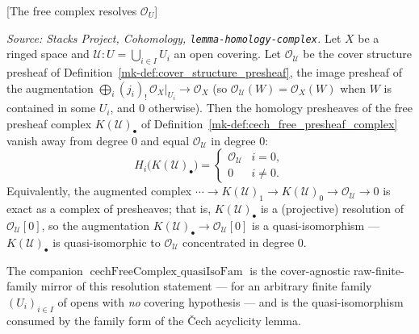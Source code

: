 \begin{lemma}

[The free complex resolves \(\mathcal{O}_U\)]
  \label{mk-lem:cech_free_complex_quasi_iso}

  \textit{Source: Stacks Project, Cohomology,
  \texttt{lemma-homology-complex}.}
  Let \(X\) be a ringed space and \(\mathcal{U} : U = \bigcup_{i \in I} U_i\) an
  open covering. Let \(\mathcal{O}_{\mathcal{U}}\) be the cover structure presheaf of
  Definition~\ref{mk-def:cover_structure_presheaf}, the image presheaf of the
  augmentation \(\bigoplus_i (j_i)_{!}\,\mathcal{O}_X|_{U_i} \to \mathcal{O}_X\) (so
  \(\mathcal{O}_{\mathcal{U}}(W) = \mathcal{O}_X(W)\) when \(W\) is contained in some
  \(U_i\), and \(0\) otherwise). Then the homology
  presheaves of the free presheaf complex
  \(K(\mathcal{U})_\bullet\) of Definition~\ref{mk-def:cech_free_presheaf_complex}
  vanish away from degree \(0\) and equal \(\mathcal{O}_{\mathcal{U}}\) in degree
  \(0\):
  \[
    H_i\bigl(K(\mathcal{U})_\bullet\bigr) =
    \begin{cases}
      \mathcal{O}_{\mathcal{U}} & i = 0, \\
      0 & i \neq 0.
    \end{cases}
  \]
  Equivalently, the augmented complex \(\cdots \to K(\mathcal{U})_1 \to
  K(\mathcal{U})_0 \to \mathcal{O}_{\mathcal{U}} \to 0\) is exact as a complex of
  presheaves; that is, \(K(\mathcal{U})_\bullet\) is a (projective) resolution of
  \(\mathcal{O}_{\mathcal{U}}[0]\), so the augmentation
  \(K(\mathcal{U})_\bullet \to \mathcal{O}_{\mathcal{U}}[0]\) is a
  quasi-isomorphism — \(K(\mathcal{U})_\bullet\) is quasi-isomorphic to
  \(\mathcal{O}_{\mathcal{U}}\) concentrated in degree \(0\).

  The companion \(\operatorname{cechFreeComplex\_quasiIsoFam}\) is the cover-agnostic
  raw-finite-family mirror of this resolution statement — for an arbitrary finite
  family \((U_i)_{i \in I}\) of opens with \emph{no} covering hypothesis — and is the
  quasi-isomorphism consumed by the family form of the {\v C}ech acyclicity lemma.
\end{lemma}
